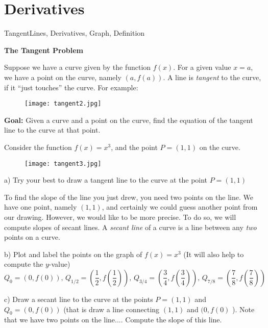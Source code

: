 \section{Derivatives}



\begin{tagblock}{TangentLines, Derivatives, Graph, Definition}
\begin{question}
	

\bigskip

\textbf{The Tangent Problem}

Suppose we have a curve given by the function $f(x)$.  For a given value $x=a$, we have a point on the curve, namely $(a, f(a))$.  A line is \emph{tangent} to the curve, if it ``just touches'' the curve.  For example:
\begin{figure}[h]
\centering
\texttt{[image: tangent2.jpg]}
\end{figure}

\textbf{Goal:} Given a curve and a point on the curve, find the equation of the tangent line to the curve at that point.

\bigskip
 Consider the function $f(x)=x^3$, and the point $P=(1,1)$ on the curve.  
\begin{figure}[h]
\centering
\texttt{[image: tangent3.jpg]}
\end{figure}

a)  Try your best to draw a tangent line to the curve at the point $P=(1,1)$ 
 
 \bigskip
 
To find the slope of the line you just drew, you need two points on the line.  We have one point, namely $(1,1)$, and certainly we could guess another point from our drawing.  However, we would like to be more precise.  To do so, we will compute slopes of secant lines.  A \emph{secant line} of a curve is a line between any \emph{two} points on a curve.  

\bigskip
b) Plot and label the points on the graph of $f(x) = x^3$ (It will also help to compute the $y$-value)
\[ Q_0 = (0, f(0)), \,Q_{1/2} = (\frac{1}{2}, f(\frac{1}{2})) , \, Q_{3/4} = (\frac{3}{4}, f(\frac{3}{4}) ),  \, Q_{7/8} = (\frac{7}{8}, f(\frac{7}{8}))  \]

\vspace{.5in}
c) Draw a secant line to the curve at the points $P = (1,1)$ and $Q_0 = (0,f(0))$ (that is draw a line connecting $(1,1)$ and $(0,f(0)$ ). Note that we have two points on the line.... Compute the slope of this line.


\end{question}
\end{tagblock}
